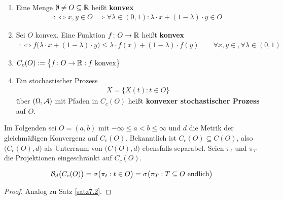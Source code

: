 \begin{definition}\label{def9.1}\
	\begin{enumerate}[label=(\arabic*)]
		\item Eine Menge $\emptyset\neq O\subseteq\mathbb{R}$ heißt \textbf{konvex}
		\begin{align*}
			:\Longleftrightarrow x,y\in O\implies\forall\lambda\in(0,1):\lambda\cdot x+(1-\lambda)\cdot y\in O
		\end{align*}
		\item Sei $O$ konvex. Eine Funktion $f\colon O\to\mathbb{R}$ heißt \textbf{konvex}
		\begin{align*}
			:\Longleftrightarrow 
			f\big(\lambda\cdot x+(1-\lambda)\cdot y\big)\leq\lambda\cdot f(x)+(1-\lambda)\cdot f(y)\qquad\forall x,y\in,\forall\lambda\in(0,1)
		\end{align*}
		\item $\begin{aligned}
			C_c(O):=\big\lbrace f\colon O\to\mathbb{R}:f\text{ konvex}\big\rbrace
		\end{aligned}$
		\item Ein stochastischer Prozess
		\begin{align*}
			X=\big\lbrace X(t):t\in O\big\rbrace
		\end{align*}				
		über $(\Omega,\mathcal{A})$ mit Pfaden in $C_c(O)$ heißt \textbf{konvexer stochastischer Prozess} auf $O$.
	\end{enumerate}
\end{definition}

Im Folgenden sei $O=(a,b)$ mit $-\infty\leq a<b\leq\infty$ und $d$ die Metrik der gleichmäßigen Konvergenz auf $C_c(O)$.
Bekanntlich ist $C_c(O)\subseteq C(O)$, also $\big(C_c(O),d\big)$ als Unterraum von $\big(C(O),d\big)$ ebensfalls separabel.
Seien $\pi_t$ und $\pi_T$ die Projektionen eingeschränkt auf $C_c(O)$.

\begin{satz}\label{satz9.2}
	\begin{align*}
		\mathcal{B}_d\big(C_c(O)\big)=\sigma\big(\pi_t:t\in O\big)=\sigma\big(\pi_T:T\subseteq O\text{ endlich}\big)
	\end{align*}
\end{satz}

\begin{proof}
	Analog zu Satz \ref{satz7.2}.
\end{proof}


